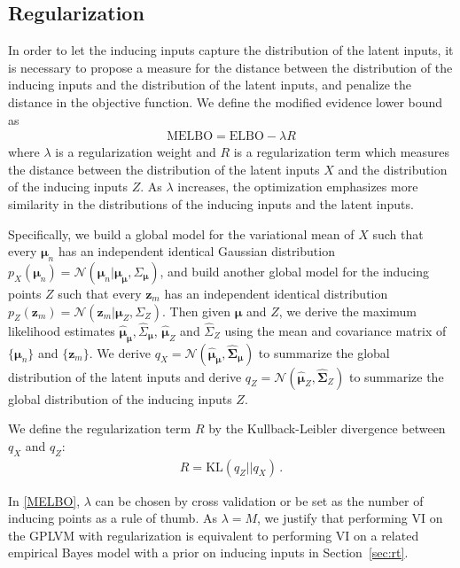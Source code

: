 \documentclass{article}
\begin{document}
\subsection{Regularization} \label{sec:r}
In order to let the inducing inputs capture the distribution of the latent inputs, it is necessary to propose a measure for the distance between the distribution of the inducing inputs and the distribution of the latent inputs, and penalize the distance in the objective function. We define the modified evidence lower bound as
\begin{eqnarray}
\mathrm{MELBO} = \mathrm{ELBO} - \lambda R
\label{MELBO}
\end{eqnarray} 
where $\lambda$ is a regularization weight and $R$ is a regularization term which measures the distance between the distribution of the latent inputs $X$ and the distribution of the inducing inputs $Z$. As $\lambda$ increases, the optimization emphasizes more similarity in the distributions of the inducing inputs and the latent inputs.

Specifically, we build a global model for the variational mean of $X$ such that every $\bm \mu_n$ has an independent identical Gaussian distribution $p_X(\bm \mu_n) = \mathcal{N}(\bm \mu_n| \bm \mu_{\bm \mu}, \Sigma_{\bm \mu})$, and build another global model for the inducing points $Z$ such that every $\bm z_m$ has an independent identical distribution $p_Z(\bm z_m) = \mathcal{N}(\bm z_m| \bm \mu_Z, \Sigma_Z)$. Then given $\bm \mu$ and $Z$, we derive the maximum likelihood estimates $\hat{\bm\mu}_{\bm \mu}, \hat{\Sigma}_{\bm \mu}$, $\hat{\bm \mu}_Z$ and $\hat{\Sigma}_Z$ using the mean and covariance matrix of $\{\bm \mu_n\}$ and $\{\bm z_m\}$. We derive $q_X = \mathcal{N}(\hat{\bm\mu}_{\bm\mu}, \hat{\bm\Sigma}_{\bm \mu})$ to summarize the global distribution of the latent inputs and derive
$q_Z = \mathcal{N}(\hat{\bm\mu}_Z, \hat{\bm\Sigma}_Z)$ to summarize the global distribution of the inducing inputs $Z$.

We define the regularization term $R$ by the Kullback-Leibler divergence between $q_X$ and $q_Z$:
\begin{eqnarray}
R = \mathrm{KL}(q_Z||q_X)\,.
\end{eqnarray}

In \ref{MELBO}, $\lambda$ can be chosen by cross validation or be set as the number of inducing points as a rule of thumb. As $\lambda = M$, we justify that performing VI on the GPLVM with regularization is equivalent to performing VI on a related empirical Bayes model with a prior on inducing inputs in Section~\ref{sec:rt}.
\end{document}
